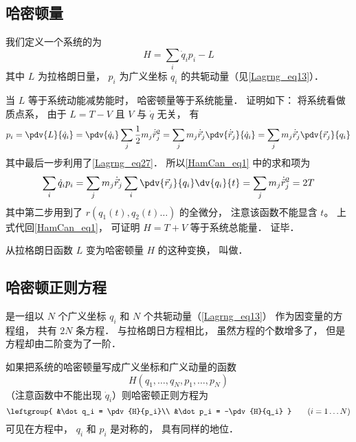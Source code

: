 

\subsection{哈密顿量}
我们定义一个系统的为
\begin{equation}\label{HamCan_eq1}
H = \sum_i \dot q_i p_i - L
\end{equation}
其中 $L$ 为拉格朗日量， $p_i$ 为广义坐标 $q_i$ 的共轭动量（见\autoref{Lagrng_eq13}）．

当 $L$ 等于系统动能减势能时， 哈密顿量等于系统能量． 证明如下： 将系统看做质点系， 由于 $L = T - V$ 且 $V$ 与 $\dot q$ 无关， 有
\begin{equation}
p_i = \pdv{L}{\dot q_i} = \pdv{\dot q_i} \sum_j \frac12 m_j \dot{\vec r}_j^2
= \sum_j m_j \dot{\vec r}_j \pdv{\dot{\vec r}_j}{\dot q_i}
= \sum_j m_j \dot{\vec r}_j  \pdv{\vec r_j}{q_i}
\end{equation}
其中最后一步利用了\autoref{Lagrng_eq27}． 所以\autoref{HamCan_eq1} 中的求和项为
\begin{equation}
 \sum_i \dot q_i p_i = \sum_j m_j \dot{\vec r}_j \sum_i \pdv{\vec r_j}{q_i}\dv{q_i}{t}
= \sum_j m_j \dot{\vec r}_j^2 = 2T
\end{equation}
其中第二步用到了 $r(q_1(t), q_2(t) \dots)$ 的全微分， 注意该函数不能显含 $t$。%
 上式代回\autoref{HamCan_eq1}， 可证明 $H = T + V$ 等于系统总能量． 证毕．

从拉格朗日函数 $L$ 变为哈密顿量 $H$ 的这种变换， 叫做．

\subsection{哈密顿正则方程}
是一组以 $N$ 个广义坐标 $q_i$ 和 $N$ 个共轭动量（\autoref{Lagrng_eq13}） 作为因变量的方程组， 共有 $2N$ 条方程． 与拉格朗日方程相比， 虽然方程的个数增多了， 但是方程却由二阶变为了一阶．

如果把系统的哈密顿量写成广义坐标和广义动量的函数
\begin{equation}
H(q_1,\dots, q_N, p_1,\dots, p_N)
\end{equation}
（注意函数中不能出现 $\dot q_i$）则哈密顿正则方程为
\begin{equation}
\leftgroup{
&\dot q_i = \pdv{H}{p_i}\\
&\dot p_i = -\pdv{H}{q_i}
}
\qquad (i = 1\dots N)
\end{equation}
可见在方程中， $q_i$ 和 $p_i$ 是对称的， 具有同样的地位．

